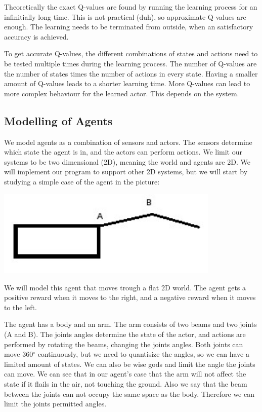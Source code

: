 \documentclass{article}
\begin{document}
Theoretically the exact Q-values are found by running the learning process
for an infinitially long time. This is not practical (duh), so approximate
Q-values are enough. The learning needs to be terminated from outside, when an
satisfactory accuracy is achieved.

To get accurate Q-values, the different combinations of states and actions
need to be tested multiple times during the learning process.
The number of Q-values are the number of states times the number of actions
in every state. Having a smaller amount of Q-values leads to a shorter learning
time. More Q-values can lead to more complex behaviour for the learned actor.
This depends on the system.


\subsection{Modelling of Agents}
We model agents as a combination of sensors and actors. The sensors determine
which state the agent is in, and the actors can perform actions.
We limit our systems to be two dimensional (2D), meaning the world and agents
are 2D. We will implement our program to support other 2D systems, but we
will start by studying a simple case of the agent in the picture:

\includegraphics[width=0.8\textwidth]{simple_agent}

We will model this agent that moves trough a flat 2D world.
The agent gets a positive reward when it moves to the right, and a negative
reward when it moves to the left.

The agent has a body and an arm. The arm consists of two beams and two joints
(A and B). The joints angles determine the state of the actor, and actions are
performed by rotating the beams, changing the joints angles.
Both joints can move 360$^\circ$ continuously, but we need to quantisize
the angles, so we can have a limited amount of states. We can also be wise
gods and limit the angle the joints can move. We can see that in our agent's
case that the arm will not affect the state if it flails in the air, not
touching the ground. Also we say that the beam between the joints can not
occupy the same space as the body. Therefore we can limit the joints
permitted angles.
\end{document}
